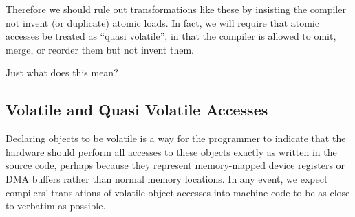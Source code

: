 Therefore we should rule out transformations like these by insisting
the compiler not invent (or duplicate) atomic loads.
In fact, we will require that atomic accesses be treated as
``quasi volatile'', in that the compiler is allowed to omit,
merge, or reorder them but not invent them.

Just what does this mean?

\subsection{Volatile and Quasi Volatile Accesses}
\label{sec:Volatile and Quasi Volatile Accesses}

Declaring objects to be volatile is a way for the programmer to
indicate that the hardware should perform all accesses to these
objects exactly as written in the source code, perhaps because they
represent memory-mapped device registers or DMA buffers rather than
normal memory locations.
In any event, we expect compilers' translations of volatile-object accesses
into machine code to be as close to verbatim as possible.

